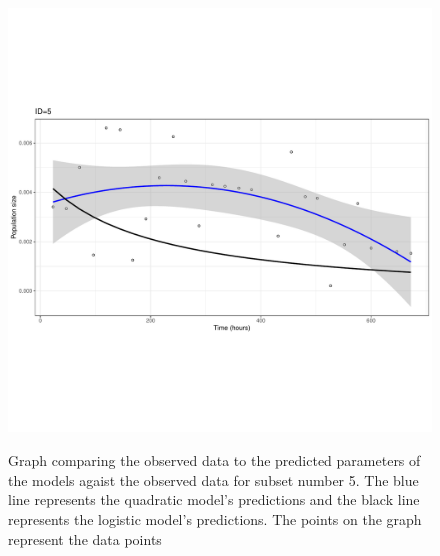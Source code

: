 \documentclass{article}[11pt]
\begin{document}
\begin{flushleft}
\begin{figure}[h]
	\includegraphics[width=12cm,height=12cm,keepaspectratio]{plot5.pdf}
	\centering
	\caption{Graph comparing the observed data to the predicted parameters of the models agaist the observed data for subset number 5. The blue line represents the quadratic model's predictions and the black line represents the logistic model's predictions. The points on the graph represent the data points}
\end{figure}



\end{flushleft}
\end{document}
